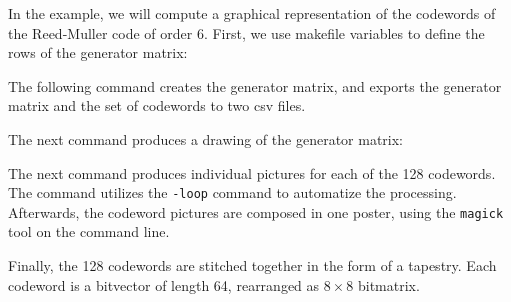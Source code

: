 In the example, we will compute a graphical representation of the codewords 
of the Reed-Muller code of order 6. First, we use makefile variables to 
define the rows of the generator matrix:














The following command creates the generator matrix, and exports the generator matrix 
and the set of codewords to two csv files. 


The next command produces a drawing of the generator matrix:



The next command produces individual pictures for each of the 128 codewords. 
The command utilizes the \verb'-loop' command to automatize the processing. 
Afterwards, the codeword pictures are composed in one poster, 
using the \verb'magick' tool on the command line.


Finally, the 128 codewords are stitched together in the form of a tapestry.
Each codeword is a bitvector of length 64, rearranged as $8 \times 8$ bitmatrix.


\bigskip


